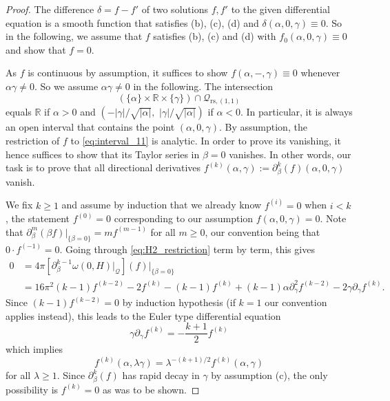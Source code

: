 \documentclass[reqno, 11pt]{amsart} %
\numberwithin{equation}{section}
\theoremstyle{plain}
\theoremstyle{definition}
\theoremstyle{remark}
\newcommand{\mr}{\mathrm}
\newcommand{\mbR}{\mathbb{R}}
\newcommand{\mcQ}{\mathcal{Q}}
\newcommand{\rs}{\mr{rs}}
\begin{document}
\begin{proof}
The difference $δ = f - f'$ of two solutions $f, f'$ to the given differential equation is a smooth function that satisfies (b), (c), (d) and $δ(α, 0, γ) \equiv 0$. So in the following, we assume that $f$ satisfies (b), (c) and (d) with $f_0(α, 0, γ) \equiv 0$ and show that $f = 0$.

As $f$ is continuous by assumption, it suffices to show $f(α,-,γ) \equiv 0$ whenever $αγ \neq 0$. So we assume $αγ \neq 0$ in the following. The intersection
\begin{equation}\label{eq:interval_11}
(\{α\}\times \mbR\times \{γ\}) \cap \mcQ_{\rs, (1,1)}
\end{equation}
equals $\mbR$ if $α>0$ and $(-|γ|/\sqrt{|α|},\,\, |γ|/\sqrt{|α|})$ if $α < 0$. In particular, it is always an open interval that contains the point $(α, 0, γ)$. By assumption, the restriction of $f$ to \eqref{eq:interval_11} is analytic. In order to prove its vanishing, it hence suffices to show that its Taylor series in $β = 0$ vanishes. In other words, our task is to prove that all directional derivatives $f^{(k)}(α,γ) := \partial_β^k(f)(α,0,γ)$ vanish.

We fix $k \geq 1$ and assume by induction that we already know $f^{(i)} = 0$ when $i < k$, the statement $f^{(0)} = 0$ corresponding to our assumption $f(α, 0, γ) = 0$. Note that $\partial^m_β (βf)\vert_{\{β = 0\}} = m f^{(m-1)}$ for all $m\geq 0$, our convention being that $0\cdot f^{(-1)} = 0$. Going through \eqref{eq:H2_restriction} term by term, this gives
\begin{equation}
\begin{aligned}
0 & = 4π[\partial_β^{k-1} ω(0, H)\vert_{\mcQ}](f)\vert_{\{β = 0\}}\\[1mm]
& = 16π^2(k-1)f^{(k-2)} - 2 f^{(k)} - (k-1)f^{(k)} + (k-1) α\partial_γ^2 f^{(k-2)} - 2γ\partial_γ f^{(k)}.
\end{aligned}
\end{equation}
Since $(k-1)f^{(k-2)} = 0$ by induction hypothesis (if $k = 1$ our convention applies instead), this leads to the Euler type differential equation
$$γ\partial_γf^{(k)} = - \frac{k+1}{2}f^{(k)}$$
which implies
$$f^{(k)}(α, λγ) = λ^{-(k+1)/2} f^{(k)}(α,γ)$$
for all $λ \geq 1$. Since $\partial^k_β(f)$ has rapid decay in $γ$ by assumption (c), the only possibility is $f^{(k)} = 0$ as was to be shown.
\end{proof}
\end{document}

